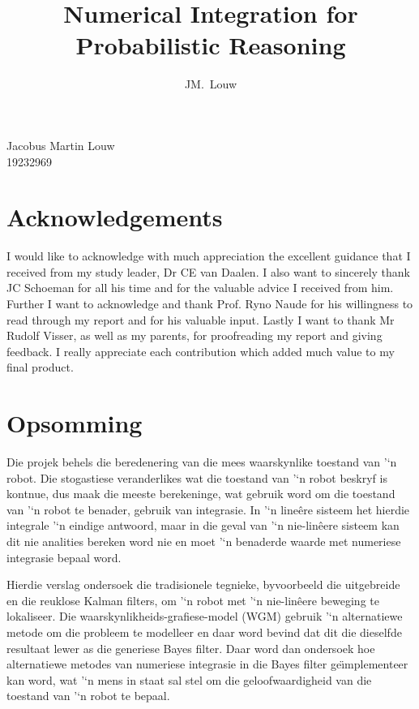 \documentclass[12pt,oneside,openany,a4paper, %
afrikaans,english,
]{memoir}
\numberwithin{equation}{chapter}
\newcommand*{\WaterMark}[2][0.15\paperwidth]{%
\AddToShipoutPicture*{\AtTextCenter{%
\parbox[c]{0pt}{\makebox[0pt][c]{%
\texttt{[image: \#2]}}}}}}
\begin{document}
\pagestyle{plain}
\frontmatter
\title{Numerical Integration for Probabilistic Reasoning}
\author{JM.\ Louw}{Jacobus Martin Louw\\
19232969}
\TitlePage



\address{Department of Electrical and Electronic Engineering,\\
University of Stellenbosch,\\
Private Bag X1, 7602 Matieland, South Africa.}
\newpage
\chapter{Acknowledgements}
I would like to acknowledge with much appreciation the excellent guidance that I received from my study leader, Dr CE van Daalen. I also want to sincerely thank JC Schoeman for all his time and for the valuable advice I received from him. Further I want to acknowledge and thank Prof. Ryno Naude for his willingness to read through my report and for his valuable input. Lastly I want to thank Mr Rudolf Visser, as well as my parents, for proofreading my report and giving feedback. I really appreciate each contribution which added much value to my final product.


\chapter{Opsomming}
Die projek behels die beredenering van die mees waarskynlike toestand van '‘n robot. Die stogastiese veranderlikes wat die toestand van '‘n robot beskryf is kontnue, dus maak die meeste berekeninge, wat gebruik word om die toestand van '‘n robot te benader, gebruik van integrasie. In '‘n lineêre sisteem het hierdie integrale '‘n eindige antwoord, maar in die geval van '‘n nie-linêere sisteem kan dit nie analities bereken word nie en moet '‘n benaderde waarde met numeriese integrasie bepaal word. 

Hierdie verslag ondersoek die tradisionele tegnieke, byvoorbeeld die uitgebreide en die reuklose Kalman filters, om '‘n robot met '‘n nie-linêere beweging te lokaliseer. Die waarskynlikheids-grafiese-model (WGM) gebruik '‘n alternatiewe metode om die probleem te modelleer en daar word bevind dat dit die dieselfde resultaat lewer as die generiese Bayes filter. Daar word dan ondersoek hoe alternatiewe metodes van numeriese integrasie in die Bayes filter ge{\"\i}mplementeer kan word, wat '‘n mens in staat sal stel om die geloofwaardigheid van die toestand van '‘n robot te bepaal.
\end{document}
